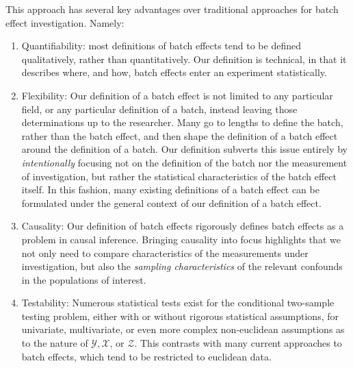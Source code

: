 This approach has several key advantages over traditional approaches for batch effect investigation. Namely:
\begin{enumerate}
    \item Quantifiability: most definitions of batch effects tend to be defined qualitatively, rather than quantitatively. Our definition is technical, in that it describes where, and how, batch effects enter an experiment statistically.
    \item Flexibility: Our definition of a batch effect is not limited to any particular field, or any particular definition of a batch, instead leaving those determinations up to the researcher. Many go to lengths to define the batch, rather than the batch effect, and then shape the definition of a batch effect around the definition of a batch. Our definition subverts this issue entirely by \textit{intentionally} focusing not on the definition of the batch nor the measurement of investigation, but rather the statistical characteristics of the batch effect itself. In this fashion, many existing definitions of a batch effect can be formulated under the general context of our definition of a batch effect.
    \item Causality: Our definition of batch effects rigorously defines batch effects as a problem in causal inference. Bringing causality into focus highlights that we not only need to compare characteristics of the measurements under investigation, but also the \textit{sampling characteristics} of the relevant confounds in the populations of interest.
    \item Testability: Numerous statistical tests exist for the conditional two-sample testing problem, either with or without rigorous statistical assumptions, for univariate, multivariate, or even more complex non-euclidean assumptions as to the nature of $\mathcal Y, \mathcal X$, or $\mathcal Z$. This contrasts with many current approaches to batch effects, which tend to be restricted to euclidean data.

\end{enumerate}
